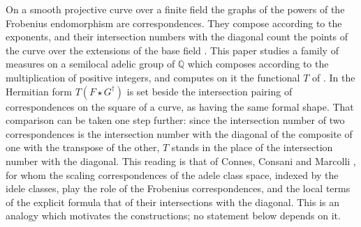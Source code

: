 \documentclass[11pt]{amsart}
\theoremstyle{definition}
\newcommand{\Q}{\mathbb Q}
\begin{document}
On a smooth projective curve over a finite field the graphs of the powers of
the Frobenius endomorphism are correspondences. They compose according to
the exponents, and their intersection numbers with the diagonal count the
points of the curve over the extensions of the base field \cite{Weil1948}.
This paper studies a family of measures on a semilocal adelic group of $\Q$
which composes according to the multiplication of positive integers, and
computes on it the functional $T$ of \cite{Companion}. In
\cite[Section~1]{Companion} the Hermitian form $T(F\star G^\dagger)$ is set
beside the intersection pairing of correspondences on the square of a curve,
as having the same formal shape. That comparison can be taken one step
further: since the intersection number of
two correspondences is the intersection number with the diagonal of the
composite of one with the transpose of the other, $T$ stands in the place
of the intersection number with the diagonal. This reading is that of
Connes, Consani and Marcolli \cite[Section~7.1]{CCM}, for whom the scaling
correspondences of the adele class space, indexed by the idele classes,
play the role of the Frobenius correspondences, and the local terms of the
explicit formula that of their intersections with the diagonal. This is an analogy which
motivates the constructions; no statement below depends on it.
\end{document}
